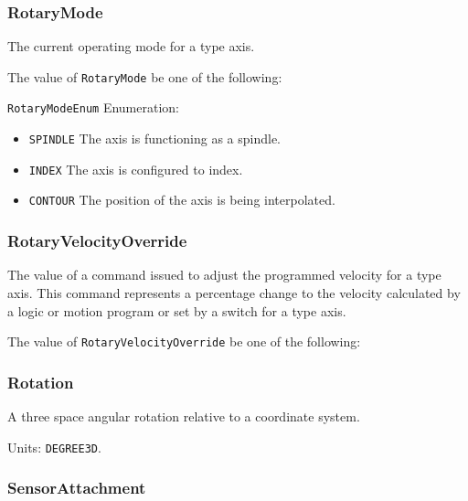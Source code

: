\subsubsection{RotaryMode}
\label{sec:RotaryMode}



The current operating mode for a  type axis.


The value of \texttt{RotaryMode} \MUST be one of the following: 


\texttt{RotaryModeEnum} Enumeration:

\begin{itemize}
\item \texttt{SPINDLE} \newline The axis is functioning as a spindle. 
\item \texttt{INDEX} \newline The axis is configured to index. 
\item \texttt{CONTOUR} \newline The position of the axis is being interpolated. 
\end{itemize}

\FloatBarrier

\subsubsection{RotaryVelocityOverride}
\label{sec:RotaryVelocityOverride}



The value of a command issued to adjust the programmed velocity for a  type axis.
 This command represents a percentage change to the velocity calculated by a logic or motion program or set by a switch for a  type axis.


The value of \texttt{RotaryVelocityOverride} \MUST be one of the following: 

\FloatBarrier

\subsubsection{Rotation}




A three space angular rotation relative to a coordinate system.


Units: \texttt{DEGREE\textunderscore 3D}.

\subsubsection{SensorAttachment}
\label{sec:SensorAttachment}



